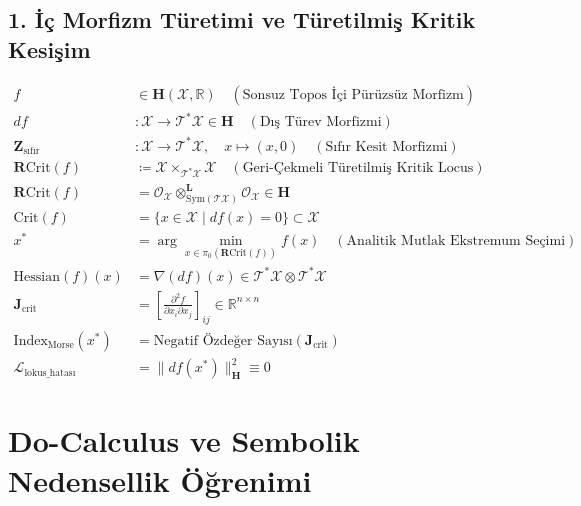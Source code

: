 \documentclass[11pt, a4paper]{article}
\begin{document}
\subsection{1. İç Morfizm Türetimi ve Türetilmiş Kritik Kesişim}
\begin{align}
f &\in \mathbf{H}(\mathcal{X}, \mathbb{R}) \quad (\text{Sonsuz Topos İçi Pürüzsüz Morfizm}) \\
df &: \mathcal{X} \longrightarrow \mathcal{T}^*\mathcal{X} \in \mathbf{H} \quad (\text{Dış Türev Morfizmi}) \\
\mathbf{Z}_{\text{sıfır}} &: \mathcal{X} \longrightarrow \mathcal{T}^*\mathcal{X}, \quad x \mapsto (x, 0) \quad (\text{Sıfır Kesit Morfizmi}) \\
\mathbf{R}\text{Crit}(f) &\coloneqq \mathcal{X} \times_{\mathcal{T}^*\mathcal{X}} \mathcal{X} \quad (\text{Geri-Çekmeli Türetilmiş Kritik Locus}) \\
\mathbf{R}\text{Crit}(f) &= \mathcal{O}_{\mathcal{X}} \otimes_{\text{Sym}(\mathcal{T}\mathcal{X})}^{\mathbf{L}} \mathcal{O}_{\mathcal{X}} \in \mathbf{H} \\
\text{Crit}(f) &= \{ x \in \mathcal{X} \mid df(x) = 0 \} \subset \mathcal{X} \\
x^* &= \arg\min_{x \in \pi_0(\mathbf{R}\text{Crit}(f))} f(x) \quad (\text{Analitik Mutlak Ekstremum Seçimi}) \\
\text{Hessian}(f)(x) &= \nabla(df)(x) \in \mathcal{T}^*\mathcal{X} \otimes \mathcal{T}^*\mathcal{X} \\
\mathbf{J}_{\text{crit}} &= \left[ \frac{\partial^2 f}{\partial x_i \partial x_j} \right]_{ij} \in \mathbb{R}^{n \times n} \\
\text{Index}_{\text{Morse}}(x^*) &= \text{Negatif Özdeğer Sayısı}(\mathbf{J}_{\text{crit}}) \\
\mathcal{L}_{\text{lokus\_hatası}} &= \| df(x^*) \|_{\mathbf{H}}^2 \equiv 0
\end{align}

\section{Do-Calculus ve Sembolik Nedensellik Öğrenimi}
\end{document}
